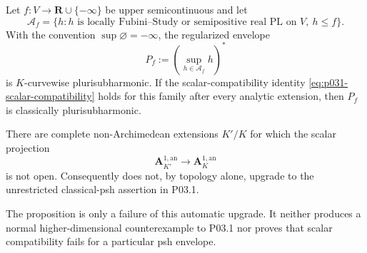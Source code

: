\begin{corollary}
\label{cor:p031-affine-obstacle-ground-field}
Let $f:V\to\mathbf R\cup\{-\infty\}$ be upper semicontinuous and let
\[
 \mathcal A_f=
 \{h:h\text{ is locally Fubini--Study or semipositive real PL on }V,
          \ h\leq f\}.
\]
With the convention $\sup\varnothing=-\infty$, the regularized envelope
\[
                       P_f:=\left(\sup_{h\in\mathcal A_f}h\right)^*
\]
is $K$-curvewise plurisubharmonic.  If the scalar-compatibility identity
\eqref{eq:p031-scalar-compatibility} holds for this family after every
analytic extension, then $P_f$ is classically plurisubharmonic.
\end{corollary}

\begin{proposition}
\label{prop:p031-scalar-openness-failure}
There are complete non-Archimedean extensions $K'/K$ for which the
scalar projection
\[
        \mathbf A_{K'}^{1,\mathrm{an}}
              \longrightarrow\mathbf A_K^{1,\mathrm{an}}
\]
is not open.  Consequently
 does not, by topology alone,
upgrade to the unrestricted classical-psh assertion in P03.1.

The proposition is only a failure of this automatic upgrade.  It neither
produces a normal higher-dimensional counterexample to P03.1 nor proves
that scalar compatibility fails for a particular psh envelope.
\end{proposition}
